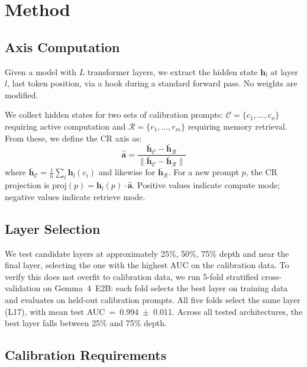 \documentclass[11pt]{article}
\begin{document}
\section{Method}\label{sec:method}

\subsection{Axis Computation}

Given a model with $L$ transformer layers, we extract the hidden state $\mathbf{h}_l$ at layer $l$, last token position, via a hook during a standard forward pass. No weights are modified.

We collect hidden states for two sets of calibration prompts: $\mathcal{C} = \{c_1, \dots, c_n\}$ requiring active computation and $\mathcal{R} = \{r_1, \dots, r_m\}$ requiring memory retrieval. From these, we define the CR axis as:
\begin{equation}
\hat{\mathbf{a}} = \frac{\bar{\mathbf{h}}_{\mathcal{C}} - \bar{\mathbf{h}}_{\mathcal{R}}}{\|\bar{\mathbf{h}}_{\mathcal{C}} - \bar{\mathbf{h}}_{\mathcal{R}}\|}
\label{eq:axis}
\end{equation}
where $\bar{\mathbf{h}}_{\mathcal{C}} = \frac{1}{n}\sum_i \mathbf{h}_l(c_i)$ and likewise for $\bar{\mathbf{h}}_{\mathcal{R}}$. For a new prompt $p$, the CR projection is $\text{proj}(p) = \mathbf{h}_l(p) \cdot \hat{\mathbf{a}}$. Positive values indicate compute mode; negative values indicate retrieve mode.

\subsection{Layer Selection}

We test candidate layers at approximately 25\%, 50\%, 75\% depth and near the final layer, selecting the one with the highest AUC on the calibration data. To verify this does not overfit to calibration data, we run 5-fold stratified cross-validation on Gemma~4~E2B: each fold selects the best layer on training data and evaluates on held-out calibration prompts. All five folds select the same layer (L17), with mean test AUC~=~0.994~$\pm$~0.011. Across all tested architectures, the best layer falls between 25\% and 75\% depth.

\subsection{Calibration Requirements}
\end{document}
